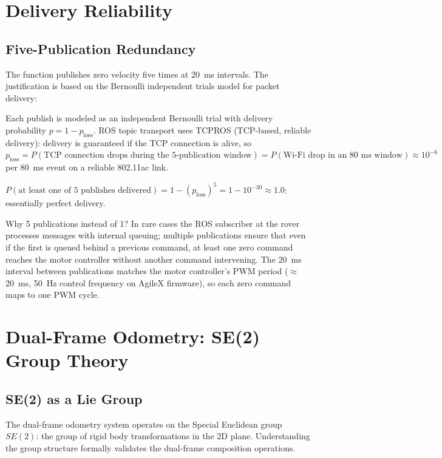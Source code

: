 \section{\texorpdfstring{}{\_safe\_stop()} Delivery Reliability}

\subsection{Five-Publication Redundancy}

The  function publishes zero velocity five times at 20~ms intervals. The justification is based on the Bernoulli independent trials model for packet delivery:

\begin{eqblock}
Each  publish is modeled as an independent Bernoulli trial with delivery probability $p=1-p_{\text{loss}}$. ROS topic transport uses TCPROS (TCP-based, reliable delivery): delivery is guaranteed if the TCP connection is alive, so $p_{\text{loss}} = P(\text{TCP connection drops during the 5-publication window}) = P(\text{Wi-Fi drop in an 80~ms window}) \approx 10^{-6}$ per 80~ms event on a reliable 802.11ac link.

$P(\text{at least one of 5 publishes delivered}) = 1-(p_{\text{loss}})^5 = 1-10^{-30} \approx 1.0$: essentially perfect delivery.

Why 5 publications instead of 1? In rare cases the ROS subscriber at the rover processes messages with internal queuing; multiple publications ensure that even if the first is queued behind a previous command, at least one zero command reaches the motor controller without another command intervening. The 20~ms interval between publications matches the motor controller's PWM period ($\approx$20~ms, 50~Hz control frequency on AgileX firmware), so each zero command maps to one PWM cycle.
\end{eqblock}

\section{Dual-Frame Odometry: SE(2) Group Theory}

\subsection{SE(2) as a Lie Group}

The dual-frame odometry system operates on the Special Euclidean group $SE(2)$: the group of rigid body transformations in the 2D plane. Understanding the group structure formally validates the dual-frame composition operations.

